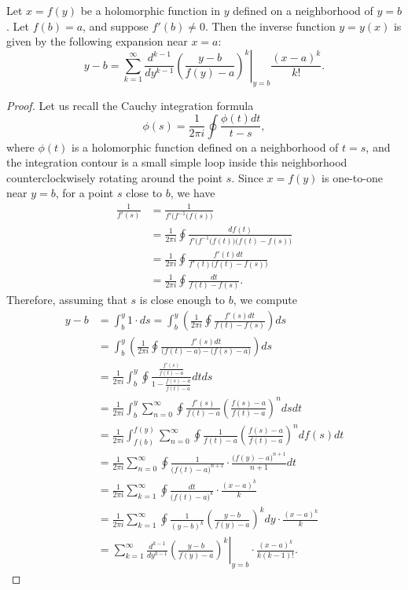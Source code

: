 \documentclass[10pt,a4paper]{amsart}
\begin{document}
\begin{thm}
Let $x=f(y)$ be a holomorphic function in $y$
defined on a neighborhood of $y=b$. Let $f(b) = a$,
and suppose $f'(b)\ne 0$. Then the inverse function
$y=y(x)$ is given by the following expansion
near $x=a$:
\begin{equation}
\label{eq:LIT}
y-b = \sum_{k=1} ^\infty
\frac{d^{k-1}}{dy^{k-1}}
\left.
\left(
\frac{y-b}{f(y)-a}
\right)^k
\right|_{y=b}
\frac{(x-a)^k}{k!}.
\end{equation}
\end{thm}

\begin{proof}
Let us recall the Cauchy integration formula
$$
\phi(s) = \frac{1}{2\pi i} \oint \frac{\phi(t)dt}{t-s},
$$
where $\phi(t)$ is a holomorphic function 
defined on a neighborhood of $t=s$, and 
the integration contour is a small simple loop 
inside this neighborhood
counterclockwisely rotating around the point $s$.
Since $x=f(y)$ is one-to-one near $y=b$, 
for a point $s$ close to $b$, we have
\begin{align*}
\frac{1}{f'(s)} 
&= \frac{1}{f'\big(f^{-1}(f(s)\big)}
\\
&=
\frac{1}{2\pi i}\oint \frac{df(t)}
{f'\big(f^{-1}(f(t)\big)\big(f(t)-f(s)\big)}
\\
&=
\frac{1}{2\pi i}\oint \frac{f'(t)dt}
{f'(t)\big(f(t)-f(s)\big)}
\\
&=
\frac{1}{2\pi i}\oint \frac{dt}
{f(t)-f(s)}.
\end{align*}
Therefore, assuming that $s$ is close enough to $b$,
we compute
\begin{align*}
y-b
&=
\int_b ^y 1\cdot ds 
=
\int_b ^y  
\left(\frac{1}{2\pi i}\oint \frac{f'(s)dt}
{f(t)-f(s)}
\right)
ds
\\
&=
\int_b ^y  
\left(\frac{1}{2\pi i}\oint \frac{f'(s)dt}
{\big(f(t)-a\big)-\big(f(s)-a\big)}
\right)
ds
\\
&=
\frac{1}{2\pi i}\int_b ^y\oint 
\frac{\frac{f'(s)}{f(t)-a}}
{1-\frac{f(s)-a}{f(t)-a}}
dtds
\\
&=
\frac{1}{2\pi i}\int_b ^y
\sum_{n=0} ^\infty
\oint
\frac{f'(s)}{f(t)-a}
\left(
\frac{f(s)-a}{f(t)-a}
\right)^n
dsdt
\\
&=
\frac{1}{2\pi i}\int_{f(b)} ^{f(y)}
\sum_{n=0} ^\infty
\oint
\frac{1}{f(t)-a}
\left(
\frac{f(s)-a}{f(t)-a}
\right)^n
df(s)dt
\\
&=
\frac{1}{2\pi i}\sum_{n=0} ^\infty
\oint
\frac{1}{\big(f(t)-a\big)^{n+1}}\cdot
\frac{\big(f(y)-a\big)^{n+1}}{n+1}dt
\\
&=
\frac{1}{2\pi i}\sum_{k=1} ^\infty
\oint
\frac{dt}{\big(f(t)-a\big)^k}
\cdot \frac{(x-a)^k}{k}
\\
&=
\frac{1}{2\pi i}\sum_{k=1} ^\infty
\oint
\frac{1}{(y-b)^k}
\left(
\frac{y-b}
{f(y)-a}
\right)^k
dy
\cdot \frac{(x-a)^k}{k}
\\
&=
\sum_{k=1} ^\infty
\left.
\frac{d^{k-1}}{dy^{k-1}}
\left(
\frac{y-b}
{f(y)-a}
\right)^k
\right|_{y=b}
\cdot \frac{(x-a)^k}{k(k-1)!}.
\end{align*}
\end{proof}
\end{document}
